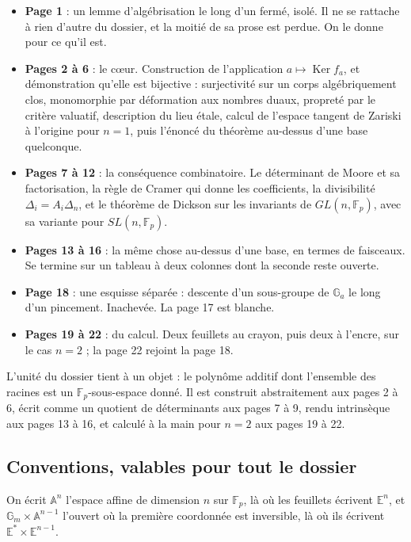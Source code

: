 \documentclass[11pt,a4paper]{article}
\begin{document}
\begin{itemize}
\item \textbf{Page 1} : un lemme d'algébrisation le long d'un fermé, isolé.
Il ne se rattache à rien d'autre du dossier, et la moitié de sa prose est
perdue. On le donne pour ce qu'il est.
\item \textbf{Pages 2 à 6} : le cœur. Construction de l'application
$a \mapsto \operatorname{Ker} f_a$, et démonstration qu'elle est bijective :
surjectivité sur un corps algébriquement clos, monomorphie par déformation
aux nombres duaux, propreté par le critère valuatif, description du lieu
étale, calcul de l'espace tangent de Zariski à l'origine pour $n = 1$, puis
l'énoncé du théorème au-dessus d'une base quelconque.
\item \textbf{Pages 7 à 12} : la conséquence combinatoire. Le déterminant de
Moore et sa factorisation, la règle de Cramer qui donne les coefficients, la
divisibilité $\Delta_i = A_i \Delta_n$, et le théorème de Dickson sur les
invariants de $GL(n, \mathbb{F}_p)$, avec sa variante pour
$SL(n, \mathbb{F}_p)$.
\item \textbf{Pages 13 à 16} : la même chose au-dessus d'une base, en termes
de faisceaux. Se termine sur un tableau à deux colonnes dont la seconde
reste ouverte.
\item \textbf{Page 18} : une esquisse séparée : descente d'un sous-groupe de
$\mathbb{G}_a$ le long d'un pincement. Inachevée. La page 17 est blanche.
\item \textbf{Pages 19 à 22} : du calcul. Deux feuillets au crayon, puis
deux à l'encre, sur le cas $n = 2$ ; la page 22 rejoint la page 18.
\end{itemize}

L'unité du dossier tient à un
objet : le polynôme additif dont l'ensemble des racines est un
$\mathbb{F}_p$-sous-espace donné. Il est construit abstraitement aux pages 2
à 6, écrit comme un quotient de déterminants aux pages 7 à 9, rendu
intrinsèque aux pages 13 à 16, et calculé à la main pour $n = 2$ aux
pages 19 à 22.

\subsection*{Conventions, valables pour tout le dossier}

On écrit $\mathbb{A}^n$ l'espace affine de dimension $n$ sur $\mathbb{F}_p$,
là où les feuillets écrivent $\mathbb{E}^n$, et
$\mathbb{G}_m \times \mathbb{A}^{n-1}$ l'ouvert où la première coordonnée est
inversible, là où ils écrivent $\mathbb{E}^* \times \mathbb{E}^{n-1}$.
\end{document}
